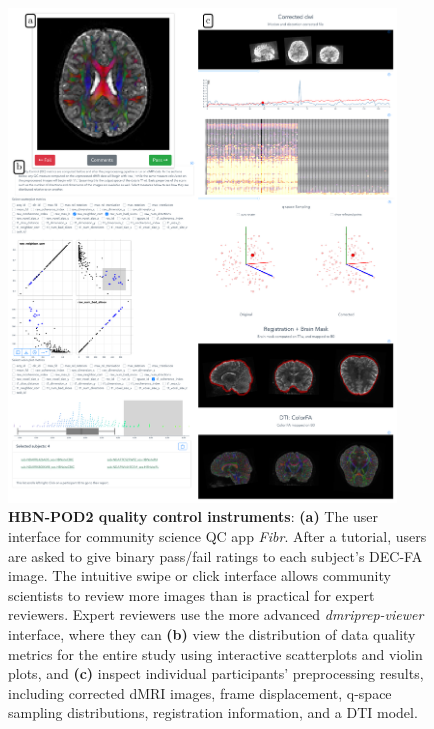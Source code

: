 \documentclass[fleqn,10pt,inline]{wlscirep}
\begin{document}
\begin{figure}[tbp]
    \includegraphics[width=0.9185\textwidth]{hbn-pod2-qc-instruments.pdf}
    \caption{
        {\bf HBN-POD2 quality control instruments}:
        {\bf (a)} The user interface for community science QC app \emph{Fibr}. After a
        tutorial, users are asked to give binary pass/fail ratings to
        each subject's DEC-FA image. The
        intuitive swipe or click interface allows community scientists to
        review more images than is practical for expert reviewers. Expert
        reviewers use the more advanced \emph{dmriprep-viewer} interface, where
        they can
        {\bf (b)} view the distribution of data quality metrics for the entire
        study using interactive scatterplots and violin plots, and
        {\bf (c)} inspect individual participants' preprocessing results,
        including corrected dMRI images, frame displacement, q-space
        sampling distributions, registration information, and a DTI
        model.
        \label{fig:web-apps}
    }
\end{figure}
\end{document}
